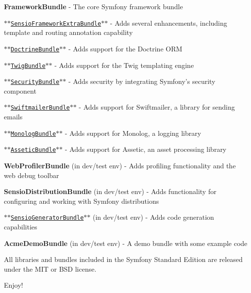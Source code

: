\begin{DoxyItemize}
\item {\bfseries Framework\+Bundle} -\/ The core Symfony framework bundle
\item \href{http://symfony.com/doc/2.3/bundles/SensioFrameworkExtraBundle/index.html}{\tt $\ast$$\ast$\+Sensio\+Framework\+Extra\+Bundle$\ast$$\ast$} -\/ Adds several enhancements, including template and routing annotation capability
\item \href{http://symfony.com/doc/2.3/book/doctrine.html}{\tt $\ast$$\ast$\+Doctrine\+Bundle$\ast$$\ast$} -\/ Adds support for the Doctrine O\+R\+M
\item \href{http://symfony.com/doc/2.3/book/templating.html}{\tt $\ast$$\ast$\+Twig\+Bundle$\ast$$\ast$} -\/ Adds support for the Twig templating engine
\item \href{http://symfony.com/doc/2.3/book/security.html}{\tt $\ast$$\ast$\+Security\+Bundle$\ast$$\ast$} -\/ Adds security by integrating Symfony's security component
\item \href{http://symfony.com/doc/2.3/cookbook/email.html}{\tt $\ast$$\ast$\+Swiftmailer\+Bundle$\ast$$\ast$} -\/ Adds support for Swiftmailer, a library for sending emails
\item \href{http://symfony.com/doc/2.3/cookbook/logging/monolog.html}{\tt $\ast$$\ast$\+Monolog\+Bundle$\ast$$\ast$} -\/ Adds support for Monolog, a logging library
\item \href{http://symfony.com/doc/2.3/cookbook/assetic/asset_management.html}{\tt $\ast$$\ast$\+Assetic\+Bundle$\ast$$\ast$} -\/ Adds support for Assetic, an asset processing library
\item {\bfseries Web\+Profiler\+Bundle} (in dev/test env) -\/ Adds profiling functionality and the web debug toolbar
\item {\bfseries Sensio\+Distribution\+Bundle} (in dev/test env) -\/ Adds functionality for configuring and working with Symfony distributions
\item \href{http://symfony.com/doc/2.3/bundles/SensioGeneratorBundle/index.html}{\tt $\ast$$\ast$\+Sensio\+Generator\+Bundle$\ast$$\ast$} (in dev/test env) -\/ Adds code generation capabilities
\item {\bfseries Acme\+Demo\+Bundle} (in dev/test env) -\/ A demo bundle with some example code
\end{DoxyItemize}

All libraries and bundles included in the Symfony Standard Edition are released under the M\+I\+T or B\+S\+D license.

Enjoy! 